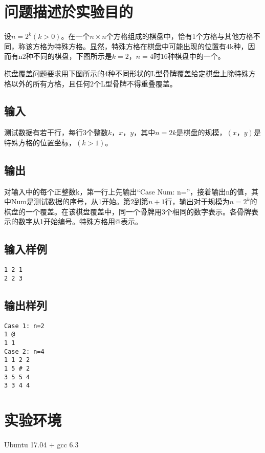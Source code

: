 \documentclass{zjureport}
\begin{document}
\thispagestyle{empty}

\makeCover


\section{问题描述於实验目的}
设$n=2^k (k>0)$。在一个$n×n$个方格组成的棋盘中，恰有1个方格与其他方格不同，称该方格为特殊方格。显然，特殊方格在棋盘中可能出现的位置有4k种，因而有n2种不同的棋盘，下图所示是$k=2，n=4$时$16$种棋盘中的一个。\par
棋盘覆盖问题要求用下图所示的4种不同形状的L型骨牌覆盖给定棋盘上除特殊方格以外的所有方格，且任何2个L型骨牌不得重叠覆盖。
\subsection{输入}
测试数据有若干行，每行$3$个整数$k，x，y$，其中$n=2k$是棋盘的规模，$(x，y)$是特殊方格的位置坐标，$(k>1)$。
\subsection{输出}
对输入中的每个正整数k，第一行上先输出“Case Num: n=”，接着输出n的值，其中Num是测试数据的序号，从$1$开始。第$2$到第$n+1$行，输出对于规模为$n=2^k$的棋盘的一个覆盖。在该棋盘覆盖中，同一个骨牌用$3$个相同的数字表示。各骨牌表示的数字从1开始编号。特殊方格用@表示。\par
\subsection{输入样例}
\begin{lstlisting}
1 2 1
2 2 3
\end{lstlisting}

\subsection{输出样列}
\begin{lstlisting}
Case 1: n=2
1 @
1 1
Case 2: n=4
1 1 2 2
1 5 # 2
3 5 5 4
3 3 4 4
\end{lstlisting}

\section{实验环境}
Ubuntu 17.04 + gcc 6.3
\end{document}
